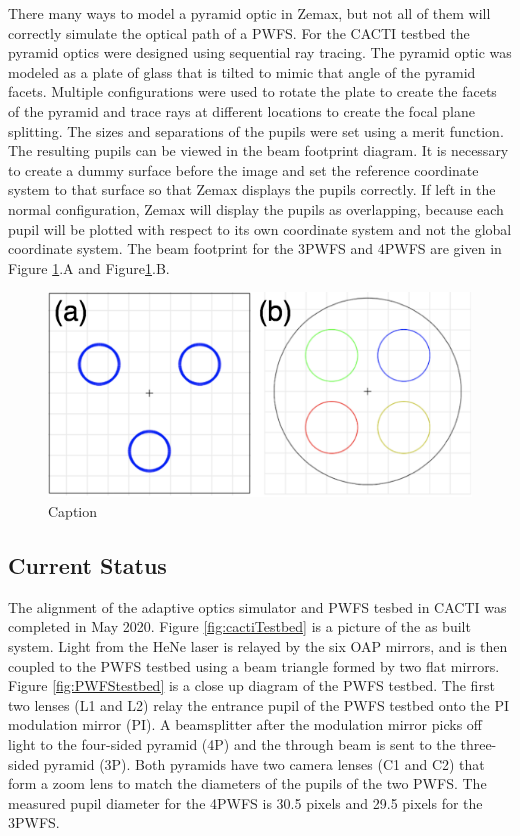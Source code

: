 There many ways to model a pyramid optic in Zemax, but not all of them will correctly simulate the optical path of a PWFS. For the CACTI testbed the pyramid optics were designed using sequential ray tracing. The pyramid optic was modeled as a plate of glass that is tilted to mimic that angle of the pyramid facets. Multiple configurations were used to rotate the plate to create the facets of the pyramid and trace rays at different locations to create the focal plane splitting. The sizes and separations of the pupils were set using a merit function. The resulting pupils can be viewed in the beam footprint diagram. It is necessary to create a dummy surface before the image and set the reference coordinate system to that surface so that Zemax displays the pupils correctly. If left in the normal configuration, Zemax will display the pupils as overlapping, because each pupil will be plotted with respect to its own coordinate system and not the global coordinate system. The beam footprint for the 3PWFS and 4PWFS are given in Figure \ref{fig:beamfp}.A and Figure\ref{fig:beamfp}.B. 

\begin{figure}
    \centering
    \includegraphics{Chapter Materials/Chapter Five Materials/BeamFootPrint.png}
    \caption{Caption}
    \label{fig:beamfp}
\end{figure}


\subsection{Current Status}

The alignment of the adaptive optics simulator and PWFS tesbed in CACTI was completed in May 2020. Figure \ref{fig:cactiTestbed} is a picture of the as built system. Light from the HeNe laser is relayed by the six OAP mirrors, and is then coupled to the PWFS testbed using a beam triangle formed by two flat mirrors. Figure \ref{fig:PWFStestbed} is a close up diagram of the PWFS testbed. The first two lenses (L1 and L2) relay the entrance pupil of the PWFS testbed onto the PI modulation mirror (PI). A beamsplitter after the modulation mirror picks off light to the four-sided pyramid (4P) and the through beam is sent to the three-sided pyramid (3P). Both pyramids have two camera lenses (C1 and C2) that form a zoom lens to match the diameters of the pupils of the two PWFS. The measured pupil diameter for the 4PWFS is 30.5 pixels and 29.5 pixels for the 3PWFS. 

